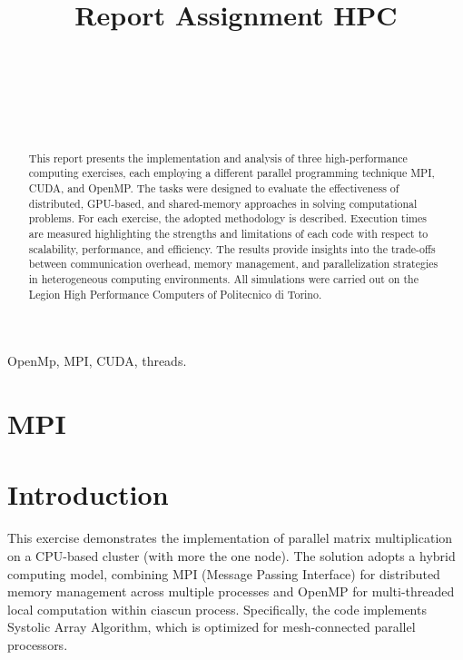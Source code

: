 \documentclass[conference]{IEEEtran}
\numberwithin{figure}{section}
\numberwithin{table}{section}
\begin{document}
\title{Report Assignment HPC\\}

\author{\\
\and
{}\\
\and
{}\\
}

\maketitle

\begin{abstract}
This report presents the implementation and analysis of three high-performance computing exercises, each employing a different parallel programming technique MPI, CUDA, and OpenMP. The tasks were designed to evaluate the effectiveness of distributed, GPU-based, and shared-memory approaches in solving computational problems. For each exercise, the adopted methodology is described. Execution times are measured highlighting the strengths and limitations of each code with respect to scalability, performance, and efficiency. The results provide insights into the trade-offs between communication overhead, memory management, and parallelization strategies in heterogeneous computing environments. All simulations were carried out on the Legion High Performance Computers \cite{a1} of Politecnico di Torino.
\end{abstract}

\begin{IEEEkeywords}
 OpenMp, MPI, CUDA, threads.
\end{IEEEkeywords}

\section{MPI}

\section*{Introduction}
This exercise demonstrates the implementation of parallel matrix multiplication on a CPU-based cluster (with more the one node). The solution adopts a hybrid computing model, combining MPI (Message Passing Interface) for distributed memory management across multiple processes and OpenMP for multi-threaded local computation within ciascun process. Specifically, the code implements Systolic Array Algorithm, which is optimized for mesh-connected parallel processors.
\end{document}
